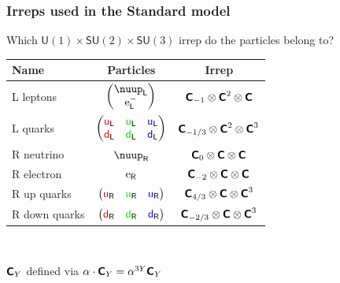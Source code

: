 \documentclass[english, fleqn]{beamer}
\renewcommand\eup{\text e}
\begin{document}
\begin{frame}
    \frametitle{Irreps used in the Standard model}

    Which $\mathsf U(1) \times \mathsf{SU}(2) \times \mathsf{SU}(3)$ irrep do the particles belong to?

    \begin{tabular}{lcc}
        \toprule
        Name & Particles & Irrep \\
        \midrule
        L leptons &
        $\begin{pmatrix}
            \nuup_\mathsf L \\
            \eup^-_\mathsf L
        \end{pmatrix}$ &
        $\text{\bfseries\sffamily{C}}_{-1} \otimes \text{\bfseries\sffamily{C}}^2 \otimes \text{\bfseries\sffamily{C}}$ \\
        L quarks &
        $\begin{pmatrix}
            \textcolor{qred}{\mathsf u}_\mathsf L &
            \textcolor{qgreen}{\mathsf u}_\mathsf L &
            \textcolor{qblue}{\mathsf u}_\mathsf L \\
            \textcolor{qred}{\mathsf d}_\mathsf L &
            \textcolor{qgreen}{\mathsf d}_\mathsf L &
            \textcolor{qblue}{\mathsf d}_\mathsf L
        \end{pmatrix}$ &
        $\text{\bfseries\sffamily{C}}_{-1/3} \otimes \text{\bfseries\sffamily{C}}^2 \otimes \text{\bfseries\sffamily{C}}^3$ \\
        R neutrino &
        $\nuup_\mathsf R$ &
        $\text{\bfseries\sffamily{C}}_{0} \otimes \text{\bfseries\sffamily{C}} \otimes \text{\bfseries\sffamily{C}}$ \\
        R electron &
        $\eup_\mathsf R$ &
        $\text{\bfseries\sffamily{C}}_{-2} \otimes \text{\bfseries\sffamily{C}} \otimes \text{\bfseries\sffamily{C}}$ \\
        R up quarks &
        $\begin{pmatrix}
            \textcolor{qred}{\mathsf u}_\mathsf R &
            \textcolor{qgreen}{\mathsf u}_\mathsf R &
            \textcolor{qblue}{\mathsf u}_\mathsf R
        \end{pmatrix}$ &
        $\text{\bfseries\sffamily{C}}_{4/3} \otimes \text{\bfseries\sffamily{C}} \otimes \text{\bfseries\sffamily{C}}^3$ \\
        R down quarks &
        $\begin{pmatrix}
            \textcolor{qred}{\mathsf d}_\mathsf R &
            \textcolor{qgreen}{\mathsf d}_\mathsf R &
            \textcolor{qblue}{\mathsf d}_\mathsf R
        \end{pmatrix}$ &
        $\text{\bfseries\sffamily{C}}_{-2/3} \otimes \text{\bfseries\sffamily{C}} \otimes \text{\bfseries\sffamily{C}}^3$ \\
        \bottomrule
    \end{tabular}

    \

    $\text{\bfseries\sffamily{C}}_Y$ defined via $\alpha \cdot \text{\bfseries\sffamily{C}}_Y = \alpha^{3Y} \text{\bfseries\sffamily{C}}_Y$
\end{frame}
\end{document}

